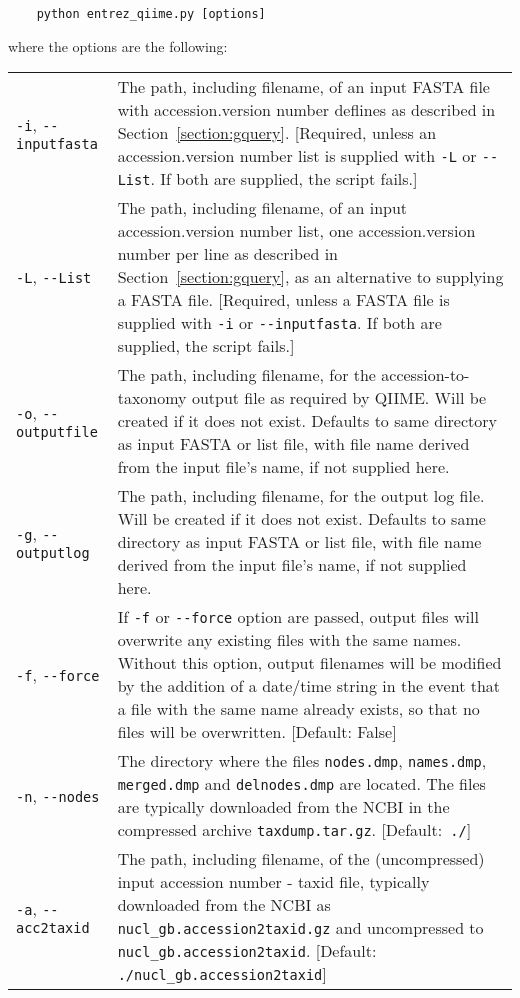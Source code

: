 \documentclass[11pt]{amsart}
\begin{document}
\begin{verbatim}
    python entrez_qiime.py [options]
\end{verbatim}

where the options are the following:

\begin{longtable}{@{} p{1.4in} p{5.35in} @{}}
      \verb|-i|, \verb|--inputfasta| & The path, including filename, of an input FASTA file with accession.version number deflines as described in Section~\ref{section:gquery}. [Required, unless an accession.version number list is supplied with \verb|-L| or \verb|--List|. If both are supplied, the script fails.] \\
      \verb|-L|, \verb|--List| & The path, including filename, of an input accession.version number list, one accession.version number per line as described in Section~\ref{section:gquery}, as an alternative to supplying a FASTA file. [Required, unless a FASTA file is supplied with \verb|-i| or \verb|--inputfasta|. If both are supplied, the script fails.] \\
      \verb|-o|, \verb|--outputfile| & The path, including filename, for the accession-to-taxonomy output file as required by QIIME. Will be created if it does not exist. Defaults to same directory as input FASTA or list file, with file name derived from the input file's name, if not supplied here. \\
      \verb|-g|, \verb|--outputlog| & The path, including filename, for the output log file. Will be created if it does not exist. Defaults to same directory as input FASTA or list file, with file name derived from the input file's name, if not supplied here. \\
      \verb|-f|, \verb|--force| & If \verb|-f| or \verb|--force| option are passed, output files will overwrite any existing files with the same names. Without this option, output filenames will be modified by the addition of a date/time string in the event that a file with the same name already exists, so that no files will be overwritten. [Default: False] \\
      \verb|-n|, \verb|--nodes| & The directory where the files \verb|nodes.dmp|, \verb|names.dmp|, \verb|merged.dmp| and \verb|delnodes.dmp| are located. The files are typically downloaded from the NCBI in the compressed archive \verb|taxdump.tar.gz|. [Default:\verb| ./|] \\
      \verb|-a|, \verb|--acc2taxid| & The path, including filename, of the (uncompressed) input accession number - taxid file, typically downloaded from the NCBI as \verb|nucl_gb.accession2taxid.gz| and uncompressed to \verb|nucl_gb.accession2taxid|. [Default:\verb| ./nucl_gb.accession2taxid|] \\

\end{longtable}
\end{document}
